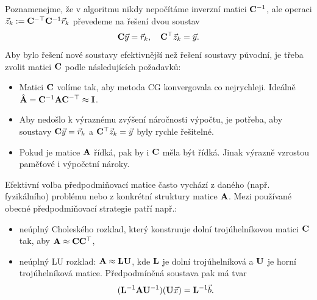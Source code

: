 Poznamenejme, že v algoritmu nikdy nepočítáme inverzní matici $\mathbf{C}^{-1}$, ale operaci $\vec{z}_k:=\mathbf{C}^{-\top}\mathbf{C}^{-1}\vec{r}_k$ převedeme na řešení dvou soustav
$$ \mathbf{C}\vec{y}=\vec{r}_k,\quad \mathbf{C}^\top\vec{z}_k=\vec{y}. $$
Aby bylo řešení nové soustavy efektivnější než řešení soustavy původní, je třeba zvolit matici $\mathbf{C}$ podle následujících požadavků:
\begin{itemize}
\item Matici $\mathbf{C}$ volíme tak, aby metoda CG konvergovala co nejrychleji. Ideálně $\hat{\mathbf{A}}=\mathbf{C}^{-1}\mathbf{A}\mathbf{C}^{-\top}\approx\mathbf{I}$.
\item Aby nedošlo k výraznému zvýšení náročnosti výpočtu, je potřeba, aby soustavy $\mathbf{C}\vec{y}=\vec{r}_k$ a $\mathbf{C}^\top\vec{z}_k=\vec{y}$ byly rychle řešitelné.
\item Pokud je matice $\mathbf{A}$ řídká, pak by i $\mathbf{C}$ měla být řídká.
Jinak výrazně vzrostou paměťové i výpočetní nároky.
\end{itemize}

Efektivní volba předpodmiňovací matice často vychází z daného (např. fyzikálního) problému nebo z konkrétní struktury matice $\mathbf{A}$.
Mezi používané obecné předpodmiňovací strategie patří např.:
\begin{itemize}
\item neúplný Choleského rozklad, který konstruuje dolní trojúhelníkovou matici $\mathbf{C}$ tak, aby $\mathbf{A}\approx\mathbf{C}\mathbf{C}^\top$,
\item neúplný LU rozklad: $\mathbf{A}\approx\mathbf{L}\mathbf{U}$, kde $\mathbf{L}$ je dolní trojúhelníková a $\mathbf{U}$ je horní trojúhelníková matice. Předpodmíněná soustava pak má tvar
$$(\mathbf{L}^{-1}\mathbf{A}\mathbf{U}^{-1})(\mathbf{U}\vec{x})=\mathbf{L}^{-1}\vec{b}.$$
\end{itemize}